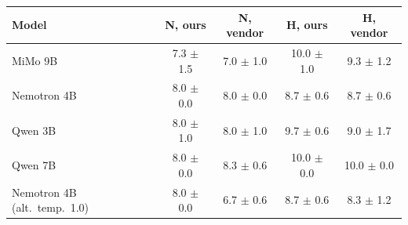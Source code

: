 \begin{tabular}{lcccc}\toprule Model & N, ours & N, vendor & H, ours & H, vendor\\\midrule
MiMo 9B & 7.3 $\pm$ 1.5 & 7.0 $\pm$ 1.0 & 10.0 $\pm$ 1.0 & 9.3 $\pm$ 1.2 \\
Nemotron 4B & 8.0 $\pm$ 0.0 & 8.0 $\pm$ 0.0 & 8.7 $\pm$ 0.6 & 8.7 $\pm$ 0.6 \\
Qwen 3B & 8.0 $\pm$ 1.0 & 8.0 $\pm$ 1.0 & 9.7 $\pm$ 0.6 & 9.0 $\pm$ 1.7 \\
Qwen 7B & 8.0 $\pm$ 0.0 & 8.3 $\pm$ 0.6 & 10.0 $\pm$ 0.0 & 10.0 $\pm$ 0.0 \\
Nemotron 4B (alt.\ temp.\ 1.0) & 8.0 $\pm$ 0.0 & 6.7 $\pm$ 0.6 & 8.7 $\pm$ 0.6 & 8.3 $\pm$ 1.2 \\
\bottomrule\end{tabular}
